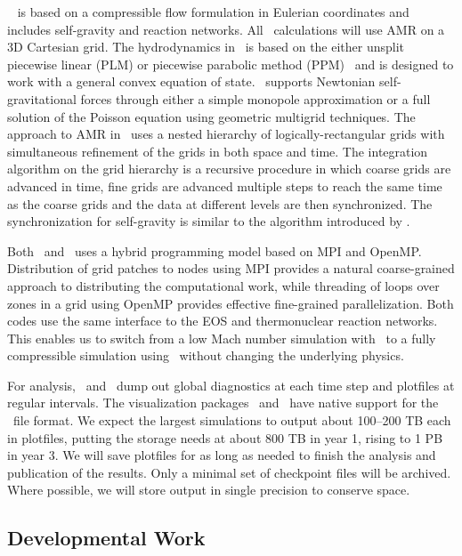 \documentclass[11pt,letterpaper,english]{article}
\begin{document}
\castro~\cite{castro} is based on a compressible flow formulation in
Eulerian coordinates and includes self-gravity and reaction networks.
All \castro\ calculations will use AMR on a 3D Cartesian grid.  The
hydrodynamics in \castro\ is based on the either unsplit piecewise
linear (PLM) or piecewise parabolic method (PPM)~\cite{ppmunsplit} and
is designed to work with a general convex equation of state.
\castro\ supports Newtonian self-gravitational forces through either a
simple monopole approximation or a full solution of the Poisson
equation using geometric multigrid techniques.  The approach to AMR in
\castro\ uses a nested hierarchy of logically-rectangular grids with
simultaneous refinement of the grids in both space and time.  The
integration algorithm on the grid hierarchy is a recursive procedure
in which coarse grids are advanced in time, fine grids are advanced
multiple steps to reach the same time as the coarse grids and the data
at different levels are then synchronized.  The synchronization for
self-gravity is similar to the algorithm introduced by
\cite{miniati-colella}.  

Both \maestro\ and \castro\ uses a hybrid
programming model based on MPI and OpenMP.  Distribution of grid
patches to nodes using MPI provides a natural coarse-grained approach
to distributing the computational work, while threading of loops over
zones in a grid using OpenMP provides effective fine-grained parallelization.
Both codes use the same interface to the EOS and 
thermonuclear reaction networks.  This enables us to
switch from a low Mach number simulation with \maestro\ to a fully
compressible simulation using \castro\ without changing the underlying
physics.  

For analysis, \maestro\ and \castro\ dump out global
diagnostics at each time step and plotfiles at regular intervals.  The
visualization packages \visit\ and \yt\ have native support for the
\boxlib\ file format.  We expect the largest simulations
to output about 100--200 TB each in plotfiles, putting the storage needs at about
800 TB in year 1, rising to 1 PB in year 3.  We will save plotfiles for as long as needed to finish the
analysis and publication of the results.  Only a minimal set of checkpoint
files will be archived.  Where possible, we will store output in single precision
to conserve space.



\subsection{Developmental Work}
\end{document}
